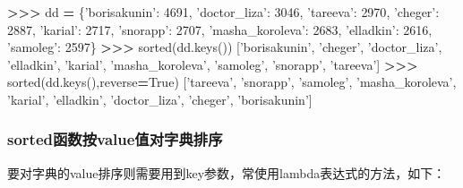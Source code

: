 \documentclass[]{ctexbook}
\newenvironment{Shaded}{\begin{snugshade}}{\end{snugshade}}
\newcommand{\BuiltInTok}[1]{#1}
\newcommand{\DecValTok}[1]{\textcolor[rgb]{0.00,0.00,0.81}{#1}}
\newcommand{\NormalTok}[1]{#1}
\newcommand{\OperatorTok}[1]{\textcolor[rgb]{0.81,0.36,0.00}{\textbf{#1}}}
\newcommand{\StringTok}[1]{\textcolor[rgb]{0.31,0.60,0.02}{#1}}
\newcommand{\VariableTok}[1]{\textcolor[rgb]{0.00,0.00,0.00}{#1}}
\begin{document}
\begin{Shaded}
\begin{Highlighting}[]
\OperatorTok{>>>}\NormalTok{ dd }\OperatorTok{=}\NormalTok{ \{}\StringTok{'borisakunin'}\NormalTok{: }\DecValTok{4691}\NormalTok{, }\StringTok{'doctor_liza'}\NormalTok{: }\DecValTok{3046}\NormalTok{, }\StringTok{'tareeva'}\NormalTok{: }\DecValTok{2970}\NormalTok{, }\StringTok{'cheger'}\NormalTok{: }\DecValTok{2887}\NormalTok{, }\StringTok{'karial'}\NormalTok{: }\DecValTok{2717}\NormalTok{, }\StringTok{'snorapp'}\NormalTok{: }\DecValTok{2707}\NormalTok{, }\StringTok{'masha_koroleva'}\NormalTok{: }\DecValTok{2683}\NormalTok{, }\StringTok{'elladkin'}\NormalTok{: }\DecValTok{2616}\NormalTok{, }\StringTok{'samoleg'}\NormalTok{: }\DecValTok{2597}\NormalTok{\}}
\OperatorTok{>>>} \BuiltInTok{sorted}\NormalTok{(dd.keys())}
\NormalTok{[}\StringTok{'borisakunin'}\NormalTok{, }\StringTok{'cheger'}\NormalTok{, }\StringTok{'doctor_liza'}\NormalTok{, }\StringTok{'elladkin'}\NormalTok{, }\StringTok{'karial'}\NormalTok{, }\StringTok{'masha_koroleva'}\NormalTok{, }\StringTok{'samoleg'}\NormalTok{, }\StringTok{'snorapp'}\NormalTok{, }\StringTok{'tareeva'}\NormalTok{]}
\OperatorTok{>>>} \BuiltInTok{sorted}\NormalTok{(dd.keys(),reverse}\OperatorTok{=}\VariableTok{True}\NormalTok{)}
\NormalTok{[}\StringTok{'tareeva'}\NormalTok{, }\StringTok{'snorapp'}\NormalTok{, }\StringTok{'samoleg'}\NormalTok{, }\StringTok{'masha_koroleva'}\NormalTok{, }\StringTok{'karial'}\NormalTok{, }\StringTok{'elladkin'}\NormalTok{, }\StringTok{'doctor_liza'}\NormalTok{, }\StringTok{'cheger'}\NormalTok{, }\StringTok{'borisakunin'}\NormalTok{]}
\end{Highlighting}
\end{Shaded}

\hypertarget{sortedux51fdux6570ux6309valueux503cux5bf9ux5b57ux5178ux6392ux5e8f}{%
\subsubsection{sorted函数按value值对字典排序}\label{sortedux51fdux6570ux6309valueux503cux5bf9ux5b57ux5178ux6392ux5e8f}}

要对字典的value排序则需要用到key参数，常使用lambda表达式的方法，如下：
\end{document}
